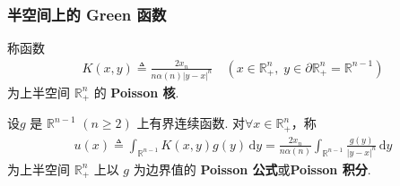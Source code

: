 \documentclass[../../main.tex]{subfiles}%
\begin{document}
\subsubsection{半空间上的 Green 函数}

\begin{definition}
称函数
\begin{align*}
K(x,y)\triangleq \frac{2x_n}{n\alpha(n)|y-x|^n}\quad (x\in\mathbb{R}_+^n,\; y\in\partial\mathbb{R}_+^n=\mathbb{R}^{n-1})
\end{align*}
为上半空间 $\mathbb{R}_+^n$ 的 \textbf{Poisson 核}.
\end{definition}

\begin{definition}
设$g$ 是 $\mathbb{R}^{n-1}$ $(n\geqslant 2)$ 上有界连续函数. 对$\forall x\in\mathbb{R}_+^n$，称
\begin{align*}
u(x)\triangleq \int_{\mathbb{R}^{n-1}} K(x,y)g(y)\,\mathrm{d}y
=\frac{2x_n}{n\alpha(n)}\int_{\mathbb{R}^{n-1}}\frac{g(y)}{|y-x|^n}\,\mathrm{d}y 
\end{align*}
为上半空间 $\mathbb{R}_+^n$ 上以 $g$ 为边界值的 \textbf{Poisson 公式}或\textbf{Poisson 积分}.
\end{definition}
\end{document}
